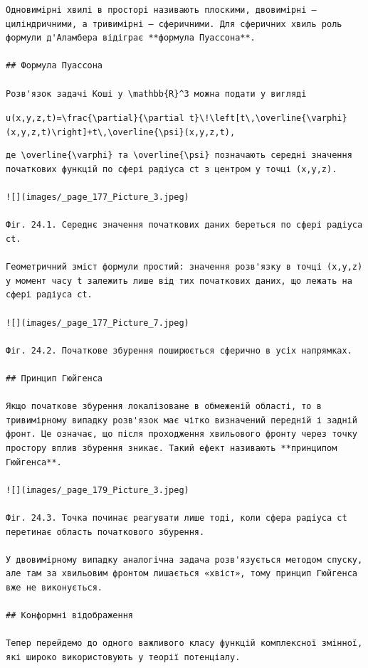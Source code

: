 \documentclass[
  ukrainian,
]{article}
\begin{document}
\begin{verbatim}
Одновимірні хвилі в просторі називають плоскими, двовимірні — циліндричними, а тривимірні — сферичними. Для сферичних хвиль роль формули д'Аламбера відіграє **формула Пуассона**.

## Формула Пуассона

Розв'язок задачі Коші у \mathbb{R}^3 можна подати у вигляді
\end{verbatim}

\texttt{u(x,y,z,t)=\textbackslash{}frac\{\textbackslash{}partial\}\{\textbackslash{}partial\ t\}\textbackslash{}!\textbackslash{}left{[}t\textbackslash{},\textbackslash{}overline\{\textbackslash{}varphi\}(x,y,z,t)\textbackslash{}right{]}+t\textbackslash{},\textbackslash{}overline\{\textbackslash{}psi\}(x,y,z,t),}

\begin{verbatim}
де \overline{\varphi} та \overline{\psi} позначають середні значення початкових функцій по сфері радіуса ct з центром у точці (x,y,z).

![](images/_page_177_Picture_3.jpeg)

Фіг. 24.1. Середнє значення початкових даних береться по сфері радіуса ct.

Геометричний зміст формули простий: значення розв'язку в точці (x,y,z) у момент часу t залежить лише від тих початкових даних, що лежать на сфері радіуса ct.

![](images/_page_177_Picture_7.jpeg)

Фіг. 24.2. Початкове збурення поширюється сферично в усіх напрямках.

## Принцип Гюйгенса

Якщо початкове збурення локалізоване в обмеженій області, то в тривимірному випадку розв'язок має чітко визначений передній і задній фронт. Це означає, що після проходження хвильового фронту через точку простору вплив збурення зникає. Такий ефект називають **принципом Гюйгенса**.

![](images/_page_179_Picture_3.jpeg)

Фіг. 24.3. Точка починає реагувати лише тоді, коли сфера радіуса ct перетинає область початкового збурення.

У двовимірному випадку аналогічна задача розв'язується методом спуску, але там за хвильовим фронтом лишається «хвіст», тому принцип Гюйгенса вже не виконується.

## Конформні відображення

Тепер перейдемо до одного важливого класу функцій комплексної змінної, які широко використовують у теорії потенціалу.


\end{verbatim}
\end{document}
